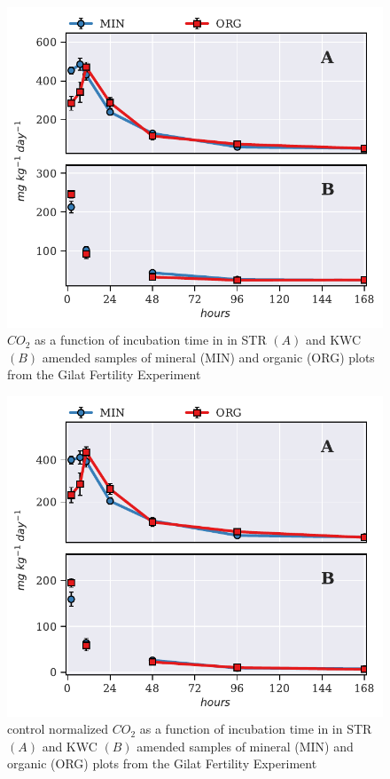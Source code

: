             	\begin{figure}[H]
            	\centering
            	\includegraphics[width=\linewidth]{thesis_figures/preliminary/treated/Resp.pdf}
            	\caption{$CO_2$ as a function of incubation time in in STR $\left(A\right)$ and KWC $\left(B\right)$ amended samples of mineral (MIN) and organic (ORG) plots from the Gilat Fertility Experiment}
            	\label{fig:resp_treated_preliminary}
            \end{figure}

            \begin{figure}[H]
            	\centering
            	\includegraphics[width=\linewidth]{thesis_figures/preliminary/control_normalized/Resp.pdf}
            	\caption{control normalized $CO_2$  as a function of incubation time in in STR $\left(A\right)$ and KWC $\left(B\right)$ amended samples of mineral (MIN) and organic (ORG) plots from the Gilat Fertility Experiment}
            	\label{fig:nor_resp_treated_preliminary}
            \end{figure}

